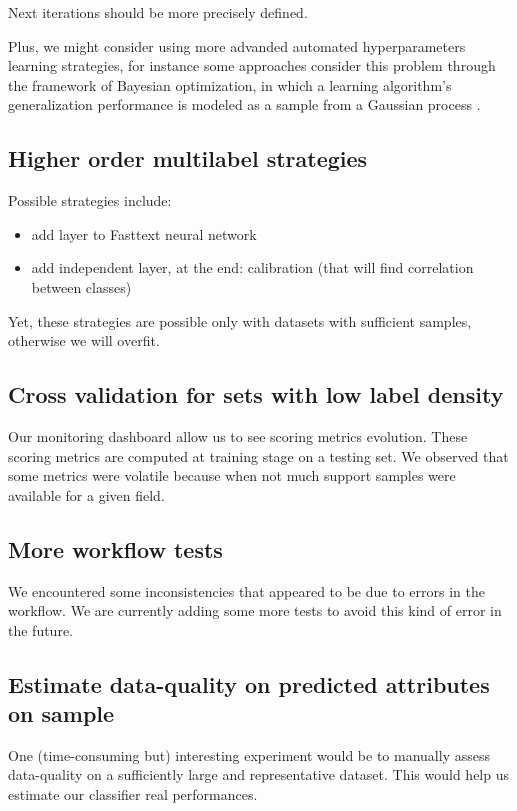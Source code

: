 Next iterations should be more precisely defined.

Plus, we might consider using more advanded automated hyperparameters learning strategies, for instance some approaches consider this problem through the framework of Bayesian optimization, in which a learning algorithm’s generalization performance is modeled as a sample from a Gaussian process \cite{Tuning}.

\subsection{Higher order multilabel strategies}
Possible strategies include:
\begin{itemize}
	\item add layer to Fasttext neural network
	\item add independent layer, at the end: calibration (that will find correlation between classes)
\end{itemize}

Yet, these strategies are possible only with datasets with sufficient samples, otherwise we will overfit.

\subsection{Cross validation for sets with low label density}

Our monitoring dashboard allow us to see scoring metrics evolution. These scoring metrics are computed at training stage on a testing set. We observed that some metrics were volatile because when not much support samples were available for a given field.

\subsection{More workflow tests}
We encountered some inconsistencies that appeared to be due to errors in the workflow. We are currently adding some more tests to avoid this kind of error in the future.

\subsection{Estimate data-quality on predicted attributes on sample}
One (time-consuming but) interesting experiment would be to manually assess data-quality on a sufficiently large and representative dataset. This would help us estimate our classifier real performances.

